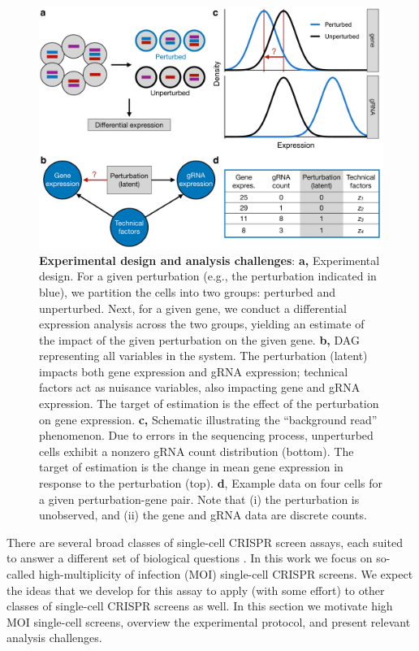 \documentclass[12pt]{article}
\begin{document}
\begin{figure}
	\centering
	\includegraphics[width=1\linewidth]{../../figures/analysis_challenges/plot.pdf}
	\caption{\textbf{Experimental design and analysis challenges}: \textbf{a,} Experimental design. For a given perturbation (e.g., the perturbation indicated in blue), we partition the cells into two groups: perturbed and unperturbed. Next, for a given gene, we conduct a differential expression analysis across the two groups, yielding an estimate of the impact of the given perturbation on the given gene. \textbf{b,} DAG representing all variables in the system. The perturbation (latent) impacts both gene expression and gRNA expression; technical factors act as nuisance variables, also impacting gene and gRNA expression. The target of estimation is the effect of the perturbation on gene expression. \textbf{c,} Schematic illustrating the ``background read'' phenomenon. Due to errors in the sequencing process, unperturbed cells exhibit a nonzero gRNA count distribution (bottom). The target of estimation is the change in mean gene expression in response to the perturbation (top). \textbf{d}, Example data on four cells for a given perturbation-gene pair. Note that (i) the perturbation is unobserved, and (ii) the gene and gRNA data are discrete counts.}
	\label{analysis_challenges}
\end{figure}

There are several broad classes of single-cell CRISPR screen assays, each suited to answer a different set of biological questions \cite{Gasperini2019,Datlinger2021,Mimitou2019}. In this work we focus on so-called high-multiplicity of infection (MOI) single-cell CRISPR screens. We expect the ideas that we develop for this assay to apply (with some effort) to other classes of single-cell CRISPR screens as well. In this section we motivate high MOI single-cell screens, overview the experimental protocol, and present relevant analysis challenges.
\end{document}

